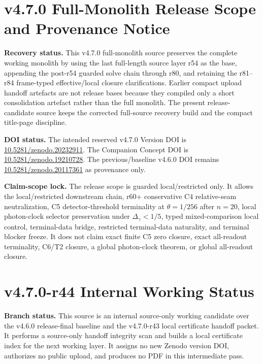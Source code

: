 \section*{v4.7.0 Full-Monolith Release Scope and Provenance Notice}
\label{sec:v470-rc9-full-monolith-recovery-notice}

\noindent\textbf{Recovery status.} This v4.7.0 full-monolith source preserves the complete working monolith by using the last full-length source layer r54 as the base, appending the post-r54 guarded solve chain through r80, and retaining the r81--r84 frame-typed effective/local closure clarifications.  Earlier compact upload handoff artefacts are not release bases because they compiled only a short consolidation artefact rather than the full monolith.  The present release-candidate source keeps the corrected full-source recovery build and the compact title-page discipline.

\noindent\textbf{DOI status.} The intended reserved v4.7.0 Version DOI is \href{https://doi.org/10.5281/zenodo.20232911}{10.5281/zenodo.20232911}. The Companion Concept DOI is \href{https://doi.org/10.5281/zenodo.19210728}{10.5281/zenodo.19210728}. The previous/baseline v4.6.0 DOI remains \href{https://doi.org/10.5281/zenodo.20117361}{10.5281/zenodo.20117361} as provenance only.

\noindent\textbf{Claim-scope lock.} The release scope is guarded local/restricted only. It allows the local/restricted downstream chain, r60+ conservative C4 relative-seam neutralization, C5 detector-threshold terminality at \(\theta=1/256\) after \(n=20\), local photon-clock selector preservation under \(\Delta_\gamma<1/5\), typed mixed-comparison local control, terminal-data bridge, restricted terminal-data naturality, and terminal blocker freeze. It does not claim exact finite C5 zero closure, exact all-readout terminality, C6/T2 closure, a global photon-clock theorem, or global all-readout closure.






\section*{v4.7.0-r44 Internal Working Status}
\noindent\textbf{Branch status.} This source is an internal source-only working
candidate over the v4.6.0 release-final baseline and the v4.7.0-r43 local
certificate handoff packet. It performs a source-only handoff integrity scan
and builds a local certificate index for the next working layer. It assigns no new Zenodo version DOI, authorizes no public
upload, and produces no PDF in this intermediate pass.

